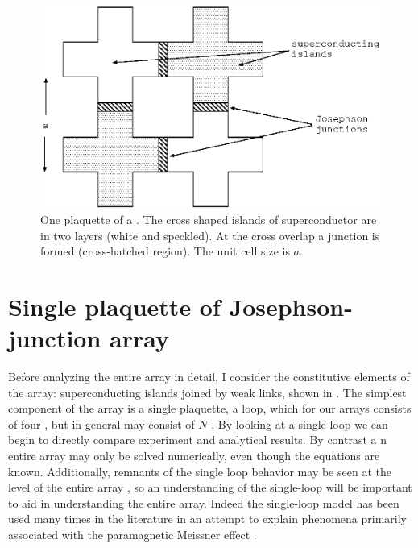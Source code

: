 %
% 
\begin{figure}[p]
\includegraphics{figs/jjarray/fig1.eps}
\caption[One plaquette of a \jja.]{One plaquette of a \jja. The 
cross shaped islands of superconductor are in two layers 
(white and speckled). At the cross overlap a junction is formed
(cross-hatched region). The unit cell size is $a$. }
\label{fig:array_realization}
\end{figure}

\section{Single plaquette of Josephson-junction array}
\label{sec:single_loop}

Before analyzing the entire array in detail, I consider
the constitutive elements of the array: superconducting islands
joined by weak links, shown in .
The simplest component of the array is a single plaquette, a loop,
which 
for our arrays consists of four \jjsnoun, but in general may consist of
$N$ \jjsnoun. 
By looking at a single loop we can begin to 
directly compare experiment and 
analytical results. By contrast a
n entire array may only be solved numerically, 
even though the equations are known. 
Additionally, remnants of the single loop behavior may be seen
at the level of the entire array
\cite{ebner_prb_31_165_1985,deleo_unpublished}, 
so an understanding of the single-loop 
will be important to aid in understanding the entire array. 
Indeed the single-loop model has been used
many times in the literature in an attempt to explain phenomena
primarily associated with the paramagnetic Meissner effect
\cite{auletta_physc_235_3315_1994,araujo_prl_78_4625_1997,%
barbara_prb_60_7489_1999,sigrist_jpsj_61_4283_1992,sigrist_rmp_503_67_1995}. 

